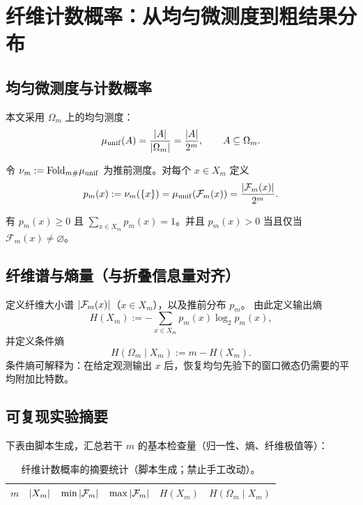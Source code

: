 \section{纤维计数概率：从均匀微测度到粗结果分布}

\subsection{均匀微测度与计数概率}

本文采用 $\Omega_m$ 上的均匀测度：
$$
\mu_{\mathrm{unif}}(A)=\frac{\left\lvert A\right\rvert}{\left\lvert \Omega_m\right\rvert}=\frac{\left\lvert A\right\rvert}{2^m},
\qquad A\subseteq \Omega_m.
$$

\begin{definition}[纤维计数概率]
\label{def:counting_probability}
令 $\nu_m:=\mathrm{Fold}_{m\#}\mu_{\mathrm{unif}}$ 为推前测度。对每个 $x\in X_m$ 定义
$$
p_m(x):=\nu_m(\{x\})=\mu_{\mathrm{unif}}(\mathcal F_m(x))=\frac{\left\lvert \mathcal F_m(x)\right\rvert}{2^m}.
$$
\end{definition}

\begin{proposition}[规范化与支持集]
\label{prop:pm_normalization}
有 $p_m(x)\ge 0$ 且 $\sum_{x\in X_m} p_m(x)=1$。并且 $p_m(x)>0$ 当且仅当 $\mathcal F_m(x)\neq\varnothing$。
\end{proposition}

\subsection{纤维谱与熵量（与折叠信息量对齐）}

定义纤维大小谱 $\left\lvert \mathcal F_m(x)\right\rvert$（$x\in X_m$），以及推前分布 $p_m$。
由此定义输出熵
$$
H(X_m):=-\sum_{x\in X_m} p_m(x)\log_2 p_m(x),
$$
并定义条件熵
$$
H(\Omega_m\mid X_m):=m-H(X_m).
$$
条件熵可解释为：在给定观测输出 $x$ 后，恢复均匀先验下的窗口微态仍需要的平均附加比特数。

\subsection{可复现实验摘要}

下表由脚本生成，汇总若干 $m$ 的基本检查量（归一性、熵、纤维极值等）：

\begin{table}[H]
\centering
\begin{tabular}{rrrrrr}
\toprule
$m$ & $\left\lvert X_m\right\rvert$ & $\min\left\lvert \mathcal F_m\right\rvert$ & $\max\left\lvert \mathcal F_m\right\rvert$ & $H(X_m)$ & $H(\Omega_m\mid X_m)$\\
\midrule
%
\end{tabular}
\caption{纤维计数概率的摘要统计（脚本生成；禁止手工改动）。}
\end{table}


